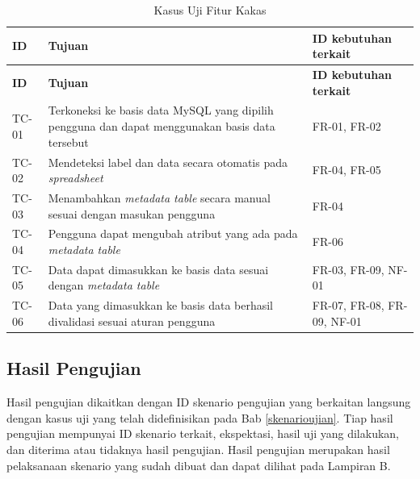 \begin{small}
	\begin{longtable}{ | p{2cm} | p{8cm} | p{3cm} | }
		\caption{Kasus Uji Fitur Kakas}
		\label{KasusUjiFA}                                                                                                                                                                          \\ \hline
		\centering\bfseries{ID} & \centering\bfseries{Tujuan}                                                                    & \centering\bfseries{ID kebutuhan terkait} \tabularnewline \hline
		\endfirsthead
		\hline
		\centering\bfseries{ID} & \centering\bfseries{Tujuan}                                                                    & \centering\bfseries{ID kebutuhan terkait} \tabularnewline \hline
		\endhead
		TC-01                   & Terkoneksi ke basis data MySQL yang dipilih pengguna dan dapat menggunakan basis data tersebut & FR-01, FR-02                                                     \\ \hline
		TC-02                   & Mendeteksi label dan data secara otomatis pada \textit{spreadsheet}                            & FR-04, FR-05                                                     \\ \hline
		TC-03                   & Menambahkan \textit{metadata table} secara manual sesuai dengan masukan pengguna               & FR-04                                                            \\ \hline
		TC-04                   & Pengguna dapat mengubah atribut yang ada pada \textit{metadata table}                          & FR-06                                                            \\ \hline
		TC-05                   & Data dapat dimasukkan ke basis data sesuai dengan \textit{metadata table}                      & FR-03, FR-09, NF-01                                              \\ \hline
		TC-06                   & Data yang dimasukkan ke basis data berhasil divalidasi sesuai aturan pengguna                  & FR-07, FR-08, FR-09, NF-01                                       \\ \hline
	\end{longtable}
\end{small}

\subsection{Hasil Pengujian}
Hasil pengujian dikaitkan dengan ID skenario pengujian yang berkaitan langsung dengan kasus uji yang telah didefinisikan pada Bab \ref{skenarioujian}. Tiap hasil pengujian mempunyai ID skenario terkait, ekspektasi, hasil uji yang dilakukan, dan diterima atau tidaknya hasil pengujian. Hasil pengujian merupakan hasil pelaksanaan skenario yang sudah dibuat dan dapat dilihat pada Lampiran B.